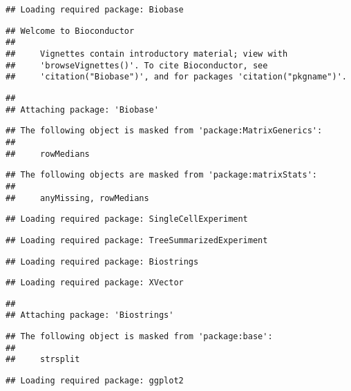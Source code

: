 \documentclass[
  oneside]{book}
\begin{document}
\begin{verbatim}
## Loading required package: Biobase
\end{verbatim}

\begin{verbatim}
## Welcome to Bioconductor
## 
##     Vignettes contain introductory material; view with
##     'browseVignettes()'. To cite Bioconductor, see
##     'citation("Biobase")', and for packages 'citation("pkgname")'.
\end{verbatim}

\begin{verbatim}
## 
## Attaching package: 'Biobase'
\end{verbatim}

\begin{verbatim}
## The following object is masked from 'package:MatrixGenerics':
## 
##     rowMedians
\end{verbatim}

\begin{verbatim}
## The following objects are masked from 'package:matrixStats':
## 
##     anyMissing, rowMedians
\end{verbatim}

\begin{verbatim}
## Loading required package: SingleCellExperiment
\end{verbatim}

\begin{verbatim}
## Loading required package: TreeSummarizedExperiment
\end{verbatim}

\begin{verbatim}
## Loading required package: Biostrings
\end{verbatim}

\begin{verbatim}
## Loading required package: XVector
\end{verbatim}

\begin{verbatim}
## 
## Attaching package: 'Biostrings'
\end{verbatim}

\begin{verbatim}
## The following object is masked from 'package:base':
## 
##     strsplit
\end{verbatim}

\begin{verbatim}
## Loading required package: ggplot2
\end{verbatim}
\end{document}
